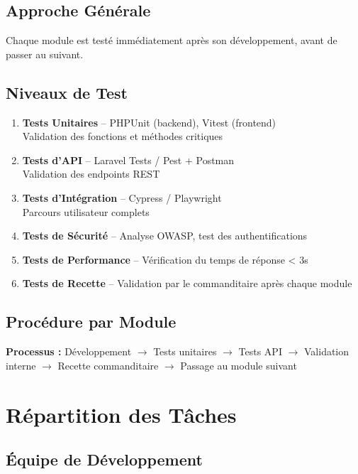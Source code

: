 \documentclass[12pt,a4paper]{report}
\begin{document}
\section{Approche Générale}
Chaque module est testé immédiatement après son développement, avant de passer au suivant.

\section{Niveaux de Test}
\begin{enumerate}
    \item \textbf{Tests Unitaires} -- PHPUnit (backend), Vitest (frontend) \\
    Validation des fonctions et méthodes critiques
    \item \textbf{Tests d'API} -- Laravel Tests / Pest + Postman \\
    Validation des endpoints REST
    \item \textbf{Tests d'Intégration} -- Cypress / Playwright \\
    Parcours utilisateur complets
    \item \textbf{Tests de Sécurité} -- Analyse OWASP, test des authentifications
    \item \textbf{Tests de Performance} -- Vérification du temps de réponse < 3s
    \item \textbf{Tests de Recette} -- Validation par le commanditaire après chaque module
\end{enumerate}

\section{Procédure par Module}
\begin{mdframed}[backgroundcolor=lightgray!30, linecolor=primary]
\textbf{Processus :} Développement $\rightarrow$ Tests unitaires $\rightarrow$ Tests API $\rightarrow$ Validation interne $\rightarrow$ Recette commanditaire $\rightarrow$ Passage au module suivant
\end{mdframed}

\chapter{Répartition des Tâches}

\section{Équipe de Développement}
\end{document}

